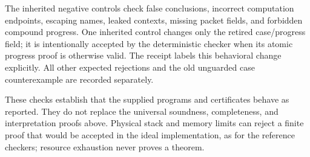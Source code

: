The inherited negative controls check false conclusions, incorrect
computation endpoints, escaping names, leaked contexts, missing packet
fields, and forbidden compound progress. One inherited control changes
only the retired case/progress field; it is intentionally accepted by
the deterministic checker when its atomic progress proof is otherwise
valid. The receipt labels this behavioral change explicitly. All other
expected rejections and the old unguarded case counterexample are
recorded separately.

These checks establish that the supplied programs and certificates behave
as reported. They do not replace the universal soundness, completeness,
and interpretation proofs above. Physical stack and memory limits can
reject a finite proof that would be accepted in the ideal implementation,
as for the reference checkers; resource exhaustion never proves a theorem.

